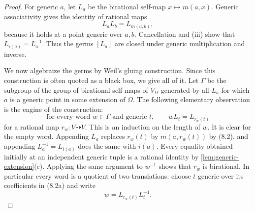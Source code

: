 \documentclass[11pt,oneside]{article}
\theoremstyle{definition}
\theoremstyle{remark}
\begin{document}
\begin{proof}
For generic $a$, let $L_a$ be the birational self-map $x\mapsto m(a,x)$.  Generic
associativity gives the identity of rational maps
\[
 L_aL_b=L_{m(a,b)},                                             \tag{8.2}
\]
because it holds at a point generic over $a,b$.  Cancellation and (iii) show that
$L_{i(a)}=L_a^{-1}$.  Thus the germs $[L_a]$ are closed under generic multiplication and
inverse.

We now algebraize the germs by Weil's gluing construction.  Since this construction is
often quoted as a black box, we give all of it.  Let $\Gamma$ be the subgroup of the
group of birational self-maps of $V_\Omega$ generated by all $L_a$ for which $a$ is a
generic point in some extension of $\Omega$.  The following elementary observation is
the engine of the construction:
\[
 \tag{8.2a}
 \text{for every word }w\in\Gamma\text{ and generic }t,
 \qquad wL_t=L_{r_w(t)}
\]
for a rational map $r_w:V\dashrightarrow V$.  This is an induction on the length of
$w$.  It is clear for the empty word.  Appending $L_a$ replaces $r_w(t)$ by
$m(a,r_w(t))$ by (8.2), and appending $L_a^{-1}=L_{i(a)}$ does the same with $i(a)$.
Every equality obtained initially at an independent generic tuple is a rational identity
by \cref{lem:generic-extension}(c).  Applying the same argument to $w^{-1}$ shows that
$r_w$ is birational.  In particular every word is a quotient of two translations:
choose $t$ generic over its coefficients in (8.2a) and write
\[
                 w=L_{r_w(t)}L_t^{-1}.                         \tag{8.2b}
\]


\end{proof}
\end{document}
